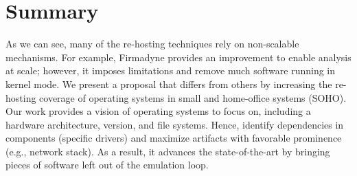 \section{Summary}

As we can see, many of the re-hosting techniques rely on non-scalable mechanisms. For example, Firmadyne provides an improvement to enable analysis at scale; however, it imposes limitations and remove much software running in kernel mode.  We present a proposal that differs from others by increasing the re-hosting coverage of operating systems in small and home-office systems (SOHO).  Our work provides a vision of operating systems to focus on, including a hardware architecture, version, and file systems.  Hence, identify dependencies in components (specific drivers) and maximize artifacts with favorable prominence (e.g., network stack).  As a result, it advances the state-of-the-art by bringing pieces of software left out of the emulation loop.